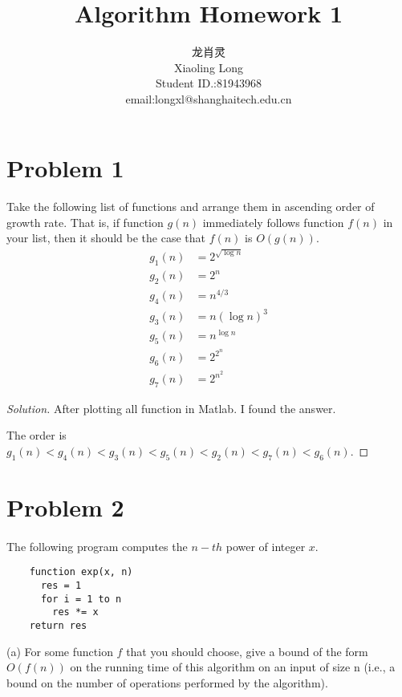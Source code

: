 \documentclass[a4paper]{article}
\title{Algorithm Homework 1}
\author{龙肖灵 \\Xiaoling Long\\Student ID.:81943968\\email:longxl@shanghaitech.edu.cn}
\newenvironment{solution}
  {\renewcommand\qedsymbol{$\blacksquare$}\begin{proof}[Solution]}
  {\end{proof}}
\begin{document}
\maketitle

\section*{Problem 1}
\paragraph{}
Take the following list of functions and arrange them in ascending
order of growth rate. That is, if function $g(n)$ immediately follows function
$f(n)$ in your list, then it should be the case that $f(n)$  is $O(g(n))$.
\begin{align*}
  g_{1}(n)&=2^{\sqrt{\log{n}}}\\
  g_{2}(n)&=2^{n}\\
  g_{4}(n)&=n^{4/3}\\
  g_{3}(n)&=n(\log{n})^{3}\\
  g_{5}(n)&=n^{\log{n}}\\
  g_{6}(n)&=2^{2^{n}}\\
  g_{7}(n)&=2^{n^{2}}
\end{align*}
\begin{solution}
  After plotting all function in Matlab. I found the answer.

  The order is $g_{1}(n)<g_{4}(n)<g_{3}(n)<g_{5}(n)<g_{2}(n)<g_{7}(n)<g_{6}(n)$.

\end{solution}

\section*{Problem 2}
\paragraph{}
The following program computes the $n-th$ power of integer $x$.
\begin{lstlisting}
    function exp(x, n)
      res = 1
      for i = 1 to n
        res *= x
    return res

\end{lstlisting}

(a) For some function $f$ that you should choose, give a bound of the form $O(f (n))$ on the running
time of this algorithm on an input of size n (i.e., a bound on the number of operations performed by the
algorithm).
\end{document}
